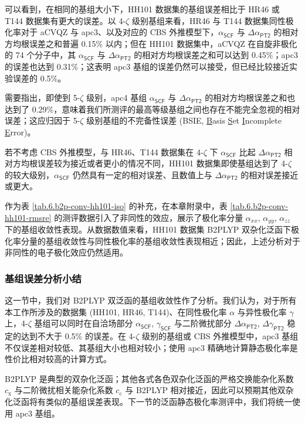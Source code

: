可以看到，在相同的基组大小下，HH101 数据集的基组误差相比于 HR46 或 T144 数据集有更大的误差。以 4-$\zeta$ 级别基组来看，HR46 与 T144 数据集同性极化率对于 aCVQZ 与 apc3、以及对应的 CBS 外推模型下，$\alpha_\textsf{SCF}$ 与 $\Delta \alpha_\textsf{PT2}$ 的相对方均根误差之和普遍 0.15\% 以内；但在 HH101 数据集中，aCVQZ 在自旋非极化的 74 个分子中，其 $\alpha_\textsf{SCF}$ 与 $\Delta \alpha_\textsf{PT2}$ 的相对方均根误差之和可以达到 0.45\%；apc3 的误差也达到 0.31\%；这表明 apc3 基组的误差仍然可以接受，但已经比较接近实验误差的 0.5\%。

需要指出，即使到 5-$\zeta$ 级别，apc4 基组 $\alpha_\textsf{SCF}$ 与 $\Delta \alpha_\textsf{PT2}$ 的相对方均根误差之和也达到了 0.29\%，意味着我们所测评的最高等级基组之间也存在不能完全忽视的相对误差；这应归因于 5-$\zeta$ 级别基组的不完备性误差 (BSIE, \underline{B}asis \underline{S}et \underline{I}ncomplete \underline{E}rror)。

若不考虑 CBS 外推模型，与 HR46、T144 数据集在 4-$\zeta$ 下 $\alpha_\textsf{SCF}$ 比起 $\Delta \alpha_\textsf{PT2}$ 相对方均根误差较为接近或者更小的情况不同，HH101 数据集即使基组达到了 4-$\zeta$ 的较大级别，$\alpha_\textsf{SCF}$ 仍然具有一定的相对误差、且数值上与 $\Delta \alpha_\textsf{PT2}$ 的相对误差接近或更大。

作为表 \ref{tab.6.b2p-conv-hh101-iso} 的补充，在本章附录中，表 \ref{tab.6.b2p-conv-hh101-rmsre} 的测评数据引入了非同性的效应，展示了极化率分量 $\alpha_{xx}$, $\alpha_{yy}$, $\alpha_{zz}$ 下的基组收敛性表现。从数据数值来看，HH101 数据集 B2PLYP 双杂化泛函下极化率分量的基组收敛性与同性极化率的基组收敛性表现相近；因此，上述分析对于非同性的电子极化效应仍然适用。

\subsubsection{基组误差分析小结}

这一节中，我们对 B2PLYP 双泛函的基组收敛性作了分析。我们认为，对于所有本工作所涉及的数据集 (HH101, HR46, T144)、在同性极化率 $\alpha$ 与异性极化率 $\gamma$ 上，4-$\zeta$ 基组可以同时在自洽场部分 $\alpha_\textsf{SCF}$, $\gamma_\textsf{SCF}$ 与二阶微扰部分 $\Delta \alpha_\textsf{PT2}$, $\Delta \gamma_\textsf{PT2}$ 稳定的达到不大于 0.5\% 的误差。在 4-$\zeta$ 级别的基组或 CBS 外推模型中，apc3 基组不仅误差相对较低、其基组大小也相对较小；使用 apc3 精确地计算静态极化率是性价比相对较高的计算方式。

B2PLYP 是典型的双杂化泛函；其他各式各色双杂化泛函的严格交换能杂化系数 $c_\mathrm{x}$ 与二阶微扰相关能杂化系数 $c_\mathrm{c}$ 与 B2PLYP 相对接近，因此可以预期其他双杂化泛函将有类似的基组误差表现。下一节的泛函静态极化率测评中，我们将统一使用 apc3 基组。

